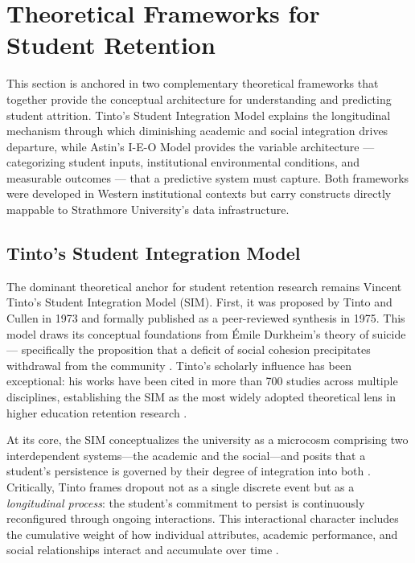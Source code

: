 \documentclass[12pt]{report}
\begin{document}
\section{Theoretical Frameworks for Student Retention}

This section is anchored in two complementary theoretical frameworks that
together provide the conceptual architecture for understanding and predicting
student attrition. Tinto's Student Integration Model explains the longitudinal
mechanism through which diminishing academic and social integration drives
departure, while Astin's I-E-O Model provides the variable
architecture --- categorizing student inputs, institutional environmental
conditions, and measurable outcomes --- that a predictive system must capture.
Both frameworks were developed in Western institutional contexts but carry
constructs directly mappable to Strathmore University's data infrastructure.

\subsection{Tinto's Student Integration Model}

The dominant theoretical anchor for student retention research remains Vincent
Tinto's Student Integration Model (SIM). First, it was proposed by Tinto and
Cullen in 1973 and formally published as a peer-reviewed synthesis in 1975. This
model draws its conceptual foundations from \'{E}mile Durkheim's theory of suicide---
specifically the proposition that a deficit of social cohesion precipitates
withdrawal from the community \parencite{tinto1975}. Tinto's scholarly influence
has been exceptional: his works have been cited in more than 700 studies across
multiple disciplines, establishing the SIM as the most widely adopted
theoretical lens in higher education retention research \parencite{bentojunior2025}.

At its core, the SIM conceptualizes the university as a microcosm comprising two
interdependent systems---the academic and the social---and posits that a student's
persistence is governed by their degree of integration into both
\parencite{tinto1975, Tinto1993}. Critically, Tinto frames dropout not as a
single discrete event but as a \textit{longitudinal process}: the student's
commitment to persist is continuously reconfigured through ongoing interactions.
This interactional character includes the cumulative weight of how individual
attributes, academic performance, and social relationships interact and
accumulate over time \parencite{Tinto1993, Nicoletti2019}.
\end{document}
